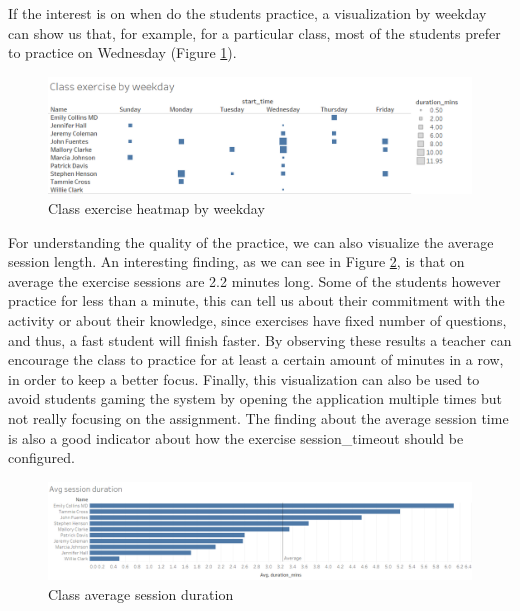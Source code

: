 If the interest is on when do the students practice, a visualization by weekday can show us that, for example, for a particular class, most of the students prefer to practice on Wednesday (Figure \ref{fig:Class_exercise_by_weekday}).

\begin{figure}[bth]
	\centering
	\includegraphics[width=1\linewidth]{gfx/Class_exercise_by_weekday}
	\caption{Class exercise heatmap by weekday}
	\label{fig:Class_exercise_by_weekday}
\end{figure}

For understanding the quality of the practice, we can also visualize the average session length. An interesting finding, as we can see in Figure \ref{fig:Avg_exercise_session_duration}, is that on average the exercise sessions are 2.2 minutes long. Some of the students however practice for less than a minute, this can tell us about their commitment with the activity or about their knowledge, since exercises have fixed number of questions, and thus, a fast student will finish faster. By observing these results a teacher can encourage the class to practice for at least a certain amount of minutes in a row, in order to keep a better focus. Finally, this visualization can also be used to avoid students gaming the system by opening the application multiple times but not really focusing on the assignment.
The finding about the average session time is also a good indicator about how the exercise session\_timeout should be configured.

\begin{figure}[bth]
	\centering
	\includegraphics[width=1\linewidth]{gfx/Avg_exercise_session_duration}
	\caption{Class average session duration}
	\label{fig:Avg_exercise_session_duration}
\end{figure}

